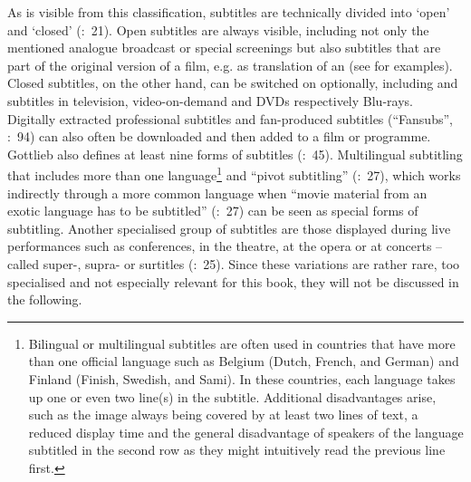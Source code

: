 As is visible from this classification, subtitles are technically divided into ‘open’ and ‘closed’ (\citealt{Diaz_cintas2007}:~21). Open subtitles are always visible, including not only the mentioned analogue broadcast or special screenings but also subtitles that are part of the original version of a film, e.g. as translation of an  (see  for examples). Closed subtitles, on the other hand, can be switched on optionally, including  and  subtitles in television, video-on-demand and DVDs respectively Blu-rays. Digitally extracted professional subtitles and fan-produced subtitles (“Fansubs”, \citealt{ohagan2009}:~94) can also often be downloaded and then added to a film or programme. Gottlieb also defines at least nine forms of  subtitles (\citeyear{Gottlieb2012}:~45). Multilingual subtitling that includes more than one language\footnote{Bilingual or multilingual subtitles are often used in countries that have more than one official language such as Belgium (Dutch, French, and German) and Finland (Finish, Swedish, and Sami). In these countries, each language takes up one or even two line(s) in the subtitle. Additional disadvantages arise, such as the image always being covered by at least two lines of text, a reduced display time and the general disadvantage of speakers of the language subtitled in the second row as they might intuitively read the previous line first.} and “pivot subtitling” (\citealt{Leisner2009}:~27), which works indirectly through a more common language when “movie material from an exotic language has to be subtitled” (\citealt{Leisner2009}:~27) can be seen as special forms of subtitling. Another specialised group of subtitles are those displayed during live performances such as conferences, in the theatre, at the opera or at concerts – called super-, supra- or surtitles (\citealt{Diaz_cintas2007}:~25). Since these variations are rather rare, too specialised and not especially relevant for this book, they will not be discussed in the following. 

